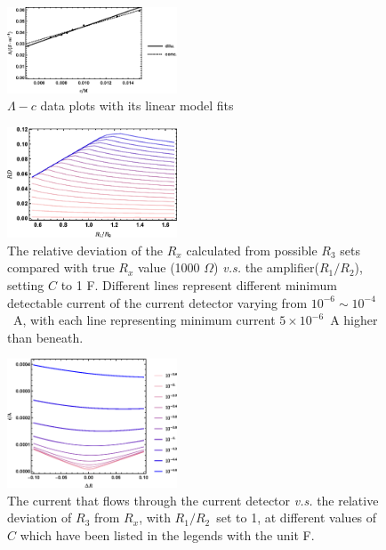 \documentclass[%
 reprint,
 amsmath,amssymb,
 aps,
]{revtex4-1}
\begin{document}
\begin{figure}
\centering
\includegraphics[width=0.45\textwidth]{figures/CMC2.eps}
\caption{$\Lambda - c$ data plots with its linear model fits}
\label{CMC2}
\end{figure}


\begin{figure}
\centering
\includegraphics[width=0.45\textwidth]{figures/R1R2Ratio.eps}
\caption{The relative deviation of the $R_x$ calculated from possible $R_3$ sets compared with true $R_x$ value (1000 $\Omega$) \emph{v.s.} the amplifier($R_1/R_2$), setting $C$ to 1 F. Different lines represent different minimum detectable current of the current detector varying from $10^{-6}\sim10^{-4}$~A, with each line representing minimum current $5 \times 10^{-6}$~A higher than beneath.}
\label{R1R2Ratio}
\end{figure}

\begin{figure}
\centering
\includegraphics[width=0.45\textwidth]{figures/ideltaRcurve.eps}
\caption{The current that flows through the current detector \emph{v.s.} the relative deviation of $R_3$ from $R_x$, with $R_1/R_2$~set to 1, at different values of $C$ which have been listed in the legends with the unit F.}
\label{idelta}
\end{figure}
\end{document}
